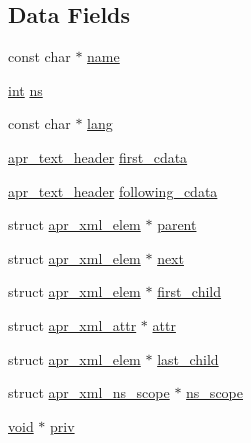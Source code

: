 \subsection*{Data Fields}
\begin{DoxyCompactItemize}
\item 
const char $\ast$ \hyperlink{structapr__xml__elem_a5b2fb684a9cfb244f88ad88f539fe3d6}{name}
\item 
\hyperlink{pcre_8txt_a42dfa4ff673c82d8efe7144098fbc198}{int} \hyperlink{structapr__xml__elem_a613ea31964572df7b41f5a9da8d0982e}{ns}
\item 
const char $\ast$ \hyperlink{structapr__xml__elem_a9a48a384f579816f62a7369aeb8b1a0c}{lang}
\item 
\hyperlink{structapr__text__header}{apr\+\_\+text\+\_\+header} \hyperlink{structapr__xml__elem_a732e8acd00e43330674fde57ef87163f}{first\+\_\+cdata}
\item 
\hyperlink{structapr__text__header}{apr\+\_\+text\+\_\+header} \hyperlink{structapr__xml__elem_a8d64c5343354e34c1cc7ac67f51cc89a}{following\+\_\+cdata}
\item 
struct \hyperlink{structapr__xml__elem}{apr\+\_\+xml\+\_\+elem} $\ast$ \hyperlink{structapr__xml__elem_a0fd30b383f2659a9ef245c2e99cb707d}{parent}
\item 
struct \hyperlink{structapr__xml__elem}{apr\+\_\+xml\+\_\+elem} $\ast$ \hyperlink{structapr__xml__elem_a8687253d504b1c1363c47117611042ac}{next}
\item 
struct \hyperlink{structapr__xml__elem}{apr\+\_\+xml\+\_\+elem} $\ast$ \hyperlink{structapr__xml__elem_a620a28337f36592d4cb1f6dd3d2e97e0}{first\+\_\+child}
\item 
struct \hyperlink{structapr__xml__attr}{apr\+\_\+xml\+\_\+attr} $\ast$ \hyperlink{structapr__xml__elem_aa9c71585c0b2a32269852047aebdd61c}{attr}
\item 
struct \hyperlink{structapr__xml__elem}{apr\+\_\+xml\+\_\+elem} $\ast$ \hyperlink{structapr__xml__elem_ad4f49811fc36f2377c72ac2c19e57abd}{last\+\_\+child}
\item 
struct \hyperlink{structapr__xml__ns__scope}{apr\+\_\+xml\+\_\+ns\+\_\+scope} $\ast$ \hyperlink{structapr__xml__elem_addfd70c22965dca4f7574639424a0c32}{ns\+\_\+scope}
\item 
\hyperlink{group__MOD__ISAPI_gacd6cdbf73df3d9eed42fa493d9b621a6}{void} $\ast$ \hyperlink{structapr__xml__elem_a0bc4296aedb5d047325f86080604d939}{priv}
\end{DoxyCompactItemize}


